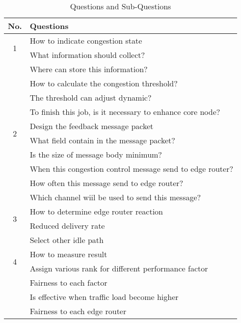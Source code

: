 \begin{table}[!htb]
    \label{tab:question}
    \centering
    \begin{tabular}{|c|l|}
        \hline
        No. & Questions \\
        \hline
        \multirow{2}{*}{1} & How to indicate congestion state \\\cline{2-2}
        & \hspace{5pt} What information should collect? \\
        & \hspace{5pt} Where can store this information? \\
        & \hspace{5pt} How to calculate the congestion threshold? \\
        & \hspace{5pt} The threshold can adjust dynamic?\\
        & \hspace{5pt} To finish this job, is it necessary to enhance core node? \\
        \hline
        \multirow{2}{*}{2} & Design the feedback message packet \\\cline{2-2}
        & \hspace{5pt} What field contain in the message packet? \\
        & \hspace{5pt} Is the size of message body minimum? \\
        & \hspace{5pt} When this congestion control message send to edge router?\\
        & \hspace{5pt} How often this message send to edge router?\\
        & \hspace{5pt} Which channel wiil be used to send this message?\\
        \hline

        \multirow{2}{*}{3} & How to determine edge router reaction \\\cline{2-2}
        & \hspace{5pt} Reduced delivery rate \\
        & \hspace{5pt} Select other idle path \\
        \hline

        \multirow{2}{*}{4} & How to measure result \\\cline{2-2}
        & \hspace{5pt} Assign various rank for different performance factor  \\
        & \hspace{5pt} Fairness to each factor \\
        & \hspace{5pt} Is effective when traffic load become higher \\
        & \hspace{5pt} Fairness to each edge router \\
        \hline

    \end{tabular}
    \caption{Questions and Sub-Questions}
\end{table}
